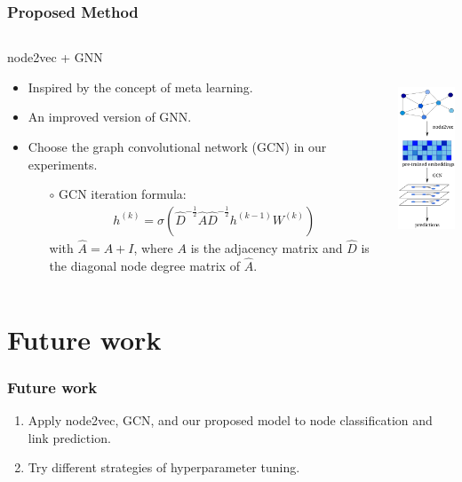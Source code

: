 \documentclass[notes, 10pt, aspectratio=169]{beamer}
\begin{document}
\begin{frame}
    \frametitle{Proposed Method}
    \begin{columns}
        \begin{column}{0.7\textwidth}
            node2vec + GNN
            \begin{itemize}
                \item Inspired by the concept of meta learning.
                \item An improved version of GNN.
                \item Choose the graph convolutional network (GCN) in our experiments.
                    \begin{itemize}
                        \item[$\circ$] GCN iteration formula:
                            \begin{align*}
                                h^{(k)} = \sigma (\hat{D}^{-\frac{1}{2}}\hat{A}\hat{D}^{-\frac{1}{2}}h^{(k-1)}W^{(k)})
                            \end{align*}
                            with $\hat{A} = A + I$, where $A$ is the adjacency matrix and $\hat{D}$ is the diagonal node degree matrix of $\hat{A}$.
            \end{itemize}
    \end{itemize}
        \end{column}
        \begin{column}{0.3\textwidth}
           \begin{center}
               \includegraphics[height=6.5cm]{./graphics/proposed-model.png}
           \end{center} 
        \end{column}
    \end{columns}
\end{frame}

\section{Future work}
\begin{frame}
    \frametitle{Future work} 
    \begin{enumerate}
        \item Apply node2vec, GCN, and our proposed model to node classification and link prediction.
        \item Try different strategies of hyperparameter tuning.
    \end{enumerate}
\end{frame}
\end{document}
